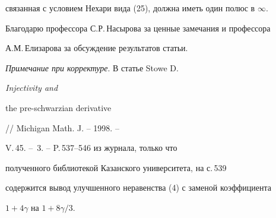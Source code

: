 связанная с условием Нехари вида (25), должна иметь один полюс в $\infty$. 


 


Благодарю профессора С.Р.\,Насырова за ценные замечания и профессора


А.М.\,Елизарова за обсуждение результатов статьи.


\setcounter{footnote}{0}





{\it Примечание при корректуре}. В статье Stowe D. {\it Injectivity and


the pre-schwarzian derivative} // Michigan Math. J. -- 1998. --


V.\,45. -- \No\,3. -- P.\,537--546 из журнала, только что


полученного библиотекой Казанского университета, на с.\,539


содержится вывод улучшенного неравенства (4) с заменой коэффициента


$1+4\gamma$ на $1+8\gamma/3$.


 


 


